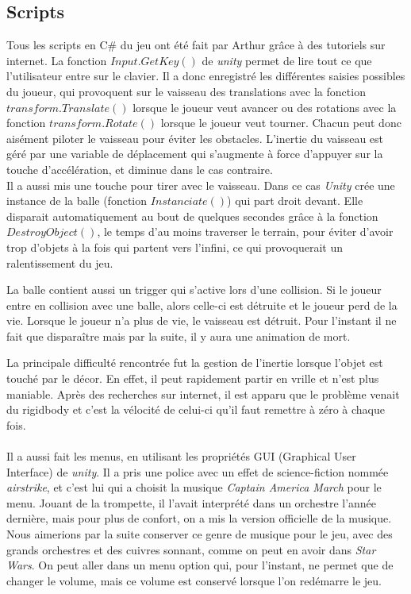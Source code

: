 \documentclass[10pt, titlepage]{report}
\begin{document}
\subsection{Scripts}
Tous les scripts en C\# du jeu ont été fait par Arthur grâce à des tutoriels sur internet. La fonction $Input.GetKey()$ de \textit{unity} permet de lire tout ce que l'utilisateur entre sur le clavier. Il a donc enregistré les différentes saisies possibles du joueur, qui provoquent sur le vaisseau des translations avec la fonction $transform.Translate()$ lorsque le joueur veut avancer ou des rotations avec la fonction $transform.Rotate()$ lorsque le joueur veut tourner. Chacun peut donc aisément piloter le vaisseau pour éviter les obstacles. L'inertie du vaisseau est géré par une variable de déplacement qui s'augmente à force d'appuyer sur la touche d'accélération, et diminue dans le cas contraire.\\

Il a aussi mis une touche pour tirer avec le vaisseau. Dans ce cas \textit{Unity} crée une instance de la balle (fonction $Instanciate()$) qui part droit devant. Elle disparait automatiquement au bout de quelques secondes grâce à la fonction $DestroyObject()$, le temps d'au moins traverser le terrain, pour éviter d'avoir trop d'objets à la fois qui partent vers l'infini, ce qui provoquerait un ralentissement du jeu.

La balle contient aussi un trigger qui s'active lors d'une collision. Si le joueur entre en collision avec une balle, alors celle-ci est détruite et le joueur perd de la vie. Lorsque le joueur n'a plus de vie, le vaisseau est détruit. Pour l'instant il ne fait que disparaître mais par la suite, il y aura une animation de mort.

La principale difficulté rencontrée fut la gestion de l'inertie lorsque l'objet est touché par le décor. En effet, il peut rapidement partir en vrille et n'est plus maniable. Après des recherches sur internet, il est apparu que le problème venait du rigidbody et c'est la vélocité de celui-ci qu'il faut remettre à zéro à chaque fois.\\ \\

 Il a aussi fait les menus, en utilisant les propriétés GUI (Graphical User Interface) de \textit{unity}. Il a pris une police avec un effet de science-fiction nommée \textit{airstrike}, et c'est lui qui a choisit la musique \textit{Captain America March} pour le menu. Jouant de la trompette, il l'avait interprété dans un orchestre l'année dernière, mais pour plus de confort, on a mis la version officielle de la musique. Nous aimerions par la suite conserver ce genre de musique pour le jeu, avec des grands orchestres et des cuivres sonnant, comme on peut en avoir dans \textit{Star Wars}. On peut aller dans un menu option qui, pour l'instant, ne permet que de changer le volume, mais ce volume est conservé lorsque l'on redémarre le jeu.
\end{document}
